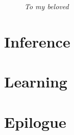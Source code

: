 \documentclass[g5paper,phd,electronic]{kthesis}
\begin{document}
\frontmatter
\maketitle
\thispagestyle{empty}
\vfill
\begin{figure}
\begin{flushright}
\Large
\textit{To my beloved}
\end{flushright}
\end{figure}
\vfill







\tableofcontents


\mainmatter





\part{Inference}





\part{Learning}
\label{part:learning}






\part{Epilogue}





\end{document}
